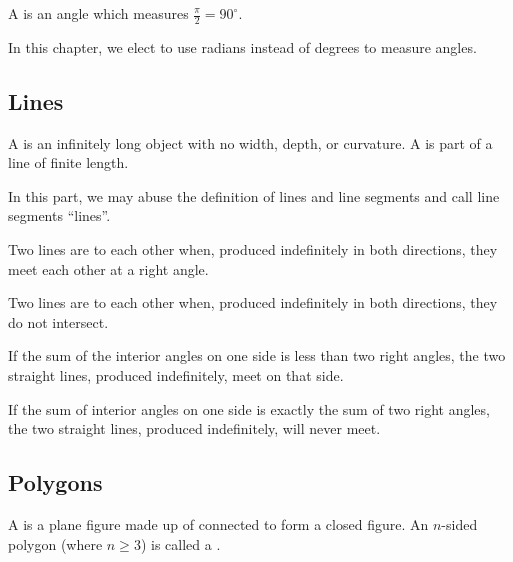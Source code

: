 \begin{definition}
    A  is an angle which measures $\frac\pi2 = 90^\circ$.
\end{definition}

In this chapter, we elect to use radians instead of degrees to measure angles.

\subsection{Lines}
\begin{definition}
    A  is an infinitely long object with no width, depth, or curvature. A  is part of a line of finite length.
\end{definition}

\begin{remark}
    In this part, we may abuse the definition of lines and line segments and call line segments ``lines''.
\end{remark}

\begin{definition}
    Two lines are  to each other when, produced indefinitely in both directions, they meet each other at a right angle.
\end{definition}

\begin{definition}
    Two lines are  to each other when, produced indefinitely in both directions, they do not intersect.
\end{definition}

\begin{axiom}
    If the sum of the interior angles on one side is less than two right angles, the two straight lines, produced indefinitely, meet on that side.
\end{axiom}

\begin{proposition}
    If the sum of interior angles on one side is exactly the sum of two right angles, the two straight lines, produced indefinitely, will never meet.
\end{proposition}

\subsection{Polygons}
\begin{definition}
    A  is a plane figure made up of  connected to form a closed figure. An $n$-sided polygon (where $n \geq 3$) is called a .
\end{definition}

